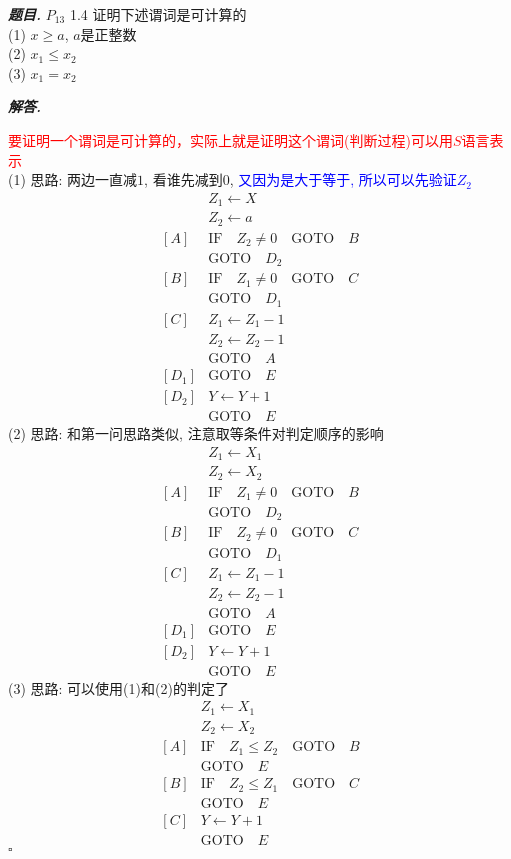 \documentclass[10pt, a4paper, oneside]{ctexart}
\newenvironment{problem}{\begin{framed}\par\noindent\textbf{\textit{题目. }}}{\end{framed}\par}
\newenvironment{solution}{%
  \par\noindent\textbf{\textit{解答. }}\ignorespaces
}{%
  \hfill\ensuremath{\square}\par
}
\begin{document}
\begin{problem}
    $P_{13}$ 1.4 证明下述谓词是可计算的\\
(1) $x\geq a$, $a$是正整数\\
(2) $x_1\leq x_2$\\
(3) $x_1=x_2$
\end{problem}
\begin{solution}
\textcolor{red}{要证明一个谓词是可计算的，实际上就是证明这个谓词(判断过程)可以用$S$语言表示}\\
(1) 思路: 两边一直减$1$, 看谁先减到$0$, \textcolor{blue}{又因为是大于等于, 所以可以先验证$Z_2$}
\begin{align*}
    &Z_1\leftarrow X\\
    &Z_2\leftarrow a\\
    [A]& \text{IF} \quad Z_2\neq 0 \quad \text{GOTO} \quad B\\
    &\text{GOTO}\quad  D_2\\
    [B]& \text{IF} \quad Z_1\neq 0 \quad \text{GOTO} \quad C\\
    &\text{GOTO}\quad  D_1\\
    [C]&Z_1\leftarrow Z_1-1\\
    &Z_2\leftarrow Z_2-1\\
    &\text{GOTO}\quad  A\\
    [D_1]&\text{GOTO}\quad  E\\
    [D_2]&Y\leftarrow Y+1\\
    &\text{GOTO}\quad  E
\end{align*}
(2) 思路: 和第一问思路类似, 注意取等条件对判定顺序的影响
\begin{align*}
    &Z_1\leftarrow X_1\\
    &Z_2\leftarrow X_2\\
    [A]& \text{IF} \quad Z_1\neq 0 \quad \text{GOTO} \quad B\\
    &\text{GOTO}\quad  D_2\\
    [B]& \text{IF} \quad Z_2\neq 0 \quad \text{GOTO} \quad C\\
    &\text{GOTO}\quad  D_1\\
    [C]&Z_1\leftarrow Z_1-1\\
    &Z_2\leftarrow Z_2-1\\
    &\text{GOTO}\quad  A\\
    [D_1]&\text{GOTO}\quad  E\\
    [D_2]&Y\leftarrow Y+1\\
    &\text{GOTO}\quad  E
\end{align*}
(3) 思路: 可以使用(1)和(2)的判定了
\begin{align*}
    &Z_1\leftarrow X_1\\
    &Z_2\leftarrow X_2\\
    [A]&\text{IF} \quad Z_1\leq Z_2 \quad \text{GOTO} \quad B\\
    &\text{GOTO}\quad  E\\
    [B]&\text{IF} \quad Z_2\leq Z_1 \quad \text{GOTO} \quad C\\
    &\text{GOTO}\quad  E\\
    [C]&Y\leftarrow Y+1\\
    &\text{GOTO}\quad  E
\end{align*}
\end{solution}
\end{document}
